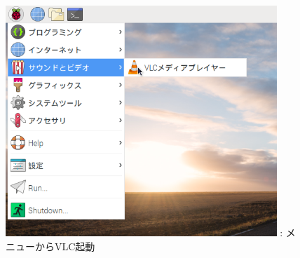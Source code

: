 \documentclass[a4paper,12pt]{jarticle}
\begin{document}
\begin{figure}[hb]
  \centering
  \begin{minipage}{10.917cm}
    {\upshape
      \includegraphics[height=8.715cm]{textbook-img113.png}
      \newline
      : メニューからVLC起動}
  \end{minipage}
\end{figure}
\clearpage
\end{document}
